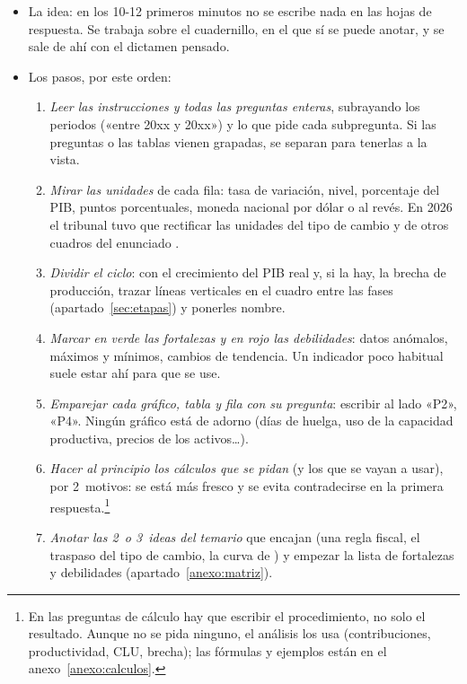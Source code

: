 \documentclass[11pt]{article}
\begin{document}
\begin{itemize}
\item La idea: en los 10-12 primeros minutos no se escribe nada en las hojas de respuesta. Se trabaja sobre el cuadernillo, en el que sí se puede anotar, y se sale de ahí con el dictamen pensado.
\item Los pasos, por este orden:
  \begin{enumerate}
  \item \emph{Leer las instrucciones y todas las preguntas enteras}, subrayando los periodos («entre 20xx y 20xx») y lo que pide cada subpregunta. Si las preguntas o las tablas vienen grapadas, se separan para tenerlas a la vista.
  \item \emph{Mirar las unidades} de cada fila: tasa de variación, nivel, porcentaje del PIB, puntos porcentuales, moneda nacional por dólar o al revés. En 2026 el tribunal tuvo que rectificar las unidades del tipo de cambio y de otros cuadros del enunciado \parencite{ATCEE2026Examenes}.
  \item \emph{Dividir el ciclo}: con el crecimiento del PIB real y, si la hay, la brecha de producción, trazar líneas verticales en el cuadro entre las fases (apartado~\ref{sec:etapas}) y ponerles nombre.
  \item \emph{Marcar en verde las fortalezas y en rojo las debilidades}: datos anómalos, máximos y mínimos, cambios de tendencia. Un indicador poco habitual suele estar ahí para que se use.
  \item \emph{Emparejar cada gráfico, tabla y fila con su pregunta}: escribir al lado «P2», «P4». Ningún gráfico está de adorno (días de huelga, uso de la capacidad productiva, precios de los activos…).
  \item \emph{Hacer al principio los cálculos que se pidan} (y los que se vayan a usar), por 2~motivos: se está más fresco y se evita contradecirse en la primera respuesta.\footnote{En las preguntas de cálculo hay que escribir el procedimiento, no solo el resultado. Aunque no se pida ninguno, el análisis los usa (contribuciones, productividad, CLU, brecha); las fórmulas y ejemplos están en el anexo~\ref{anexo:calculos}.}
  \item \emph{Anotar las 2~o 3~ideas del temario} que encajan (una regla fiscal, el traspaso del tipo de cambio, la curva de ) y empezar la lista de fortalezas y debilidades (apartado~\ref{anexo:matriz}).
  \end{enumerate}
\end{itemize}
\end{document}

